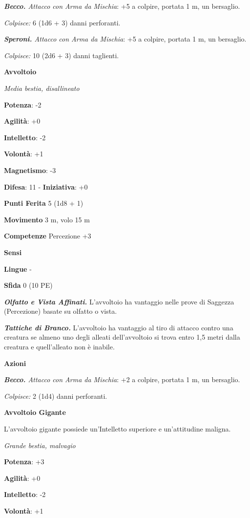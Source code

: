 \begin{multicols}{2}
\emph{\textbf{Becco.} Attacco con Arma da Mischia}: +5 a colpire,
portata 1 m, un bersaglio.

\emph{Colpisce:} 6 (1d6 + 3) danni perforanti.

\emph{\textbf{Speroni.} Attacco con Arma da Mischia}: +5 a colpire,
portata 1 m, un bersaglio.

\emph{Colpisce:} 10 (2d6 + 3) danni taglienti.

\textbf{Avvoltoio}

\emph{Media bestia, disallineato}

\textbf{Potenza}: -2

\textbf{Agilità}: +0

\textbf{Intelletto}: -2

\textbf{Volontà}: +1

\textbf{Magnetismo}: -3

\textbf{Difesa}: 11 - \textbf{Iniziativa}: +0

\textbf{Punti Ferita} 5 (1d8 + 1)

\textbf{Movimento} 3 m, volo 15 m

\textbf{Competenze} Percezione +3

\textbf{Sensi} 

\textbf{Lingue} -

\textbf{Sfida} 0 (10 PE)\smallskip

\emph{\textbf{Olfatto e Vista Affinati.}} L'avvoltoio ha vantaggio nelle
prove di Saggezza (Percezione) basate su olfatto o vista.

\emph{\textbf{Tattiche di Branco.}} L'avvoltoio ha vantaggio al tiro di
attacco contro una creatura se almeno uno degli alleati dell'avvoltoio
si trova entro 1,5 metri dalla creatura e quell'alleato non è inabile.

\smallskip\textbf{Azioni}

\emph{\textbf{Becco.} Attacco con Arma da Mischia}: +2 a colpire,
portata 1 m, un bersaglio.

\emph{Colpisce:} 2 (1d4) danni perforanti.

\textbf{Avvoltoio Gigante}

L'avvoltoio gigante possiede un'Intelletto superiore e un'attitudine
maligna.

\emph{Grande bestia, malvagio}

\textbf{Potenza}: +3

\textbf{Agilità}: +0

\textbf{Intelletto}: -2

\textbf{Volontà}: +1


\end{multicols}
